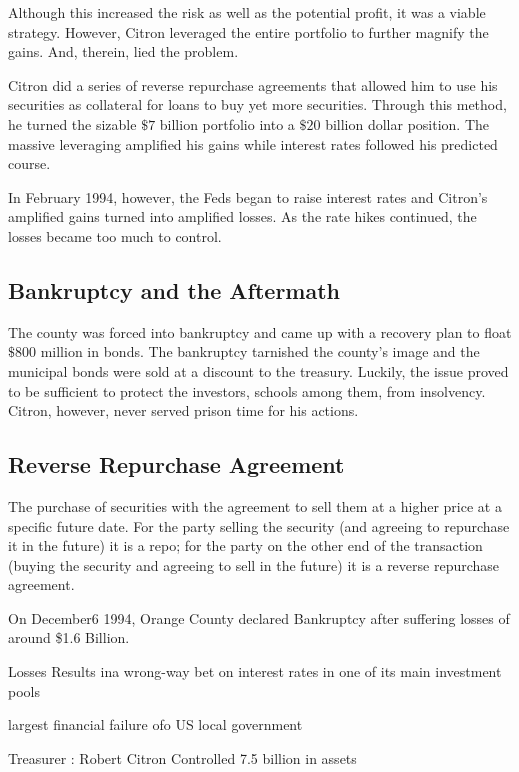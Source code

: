 \documentclass[PRMIA4A.tex]{subfiles}
\begin{document}
Although this increased the risk as well as the potential profit, it was a viable strategy. However, Citron leveraged the entire portfolio to further magnify the gains. And, therein, lied the problem.

Citron did a series of reverse repurchase agreements that allowed him to use his securities as collateral for loans to buy yet more securities. Through this method, he turned the sizable $\$7$ billion portfolio into a $\$20$ billion dollar position. The massive leveraging amplified his gains while interest rates followed his predicted course.

In February 1994, however, the Feds began to raise interest rates and Citron's amplified gains turned into amplified losses. As the rate hikes continued, the losses became too much to control.

\subsection*{Bankruptcy and the Aftermath}

The county was forced into bankruptcy and came up with a recovery plan to float $\$800$ million in bonds. The bankruptcy tarnished the county's image and the municipal bonds were sold at a discount to the treasury. Luckily, the issue proved to be sufficient to protect the investors, schools among them, from insolvency. Citron, however, never served prison time for his actions.

\subsection*{Reverse Repurchase Agreement}

The purchase of securities with the agreement to sell them at a higher price at a specific future date.
For the party selling the security (and agreeing to repurchase it in the future) it is a repo; for the party on the other end of the transaction (buying the security and agreeing to sell in the future) it is a reverse repurchase agreement.


On December6 1994, Orange County declared Bankruptcy after suffering losses of around \$1.6 Billion.

Losses Results ina wrong-way bet on interest rates in one of its main investment pools

largest financial failure ofo US local government

Treasurer : Robert Citron
Controlled 7.5 billion in assets
\end{document}

